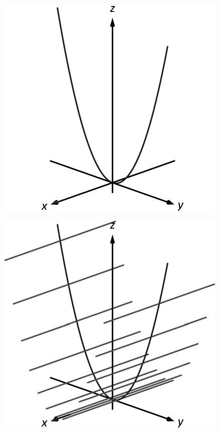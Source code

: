 \documentclass[10pt]{article}
\begin{document}
\includegraphics{figspace4a_3DBW.pdf}
\texttt{}

\includegraphics{figspace4b_3DBW.pdf}
\texttt{}
\end{document}
